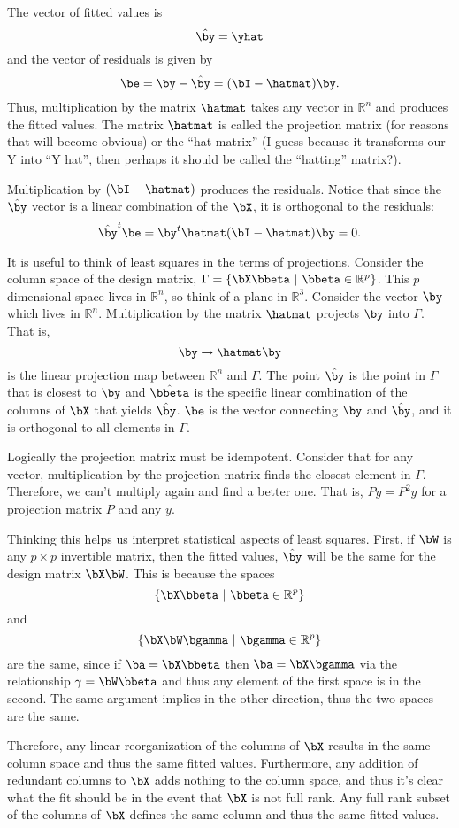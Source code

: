 The vector of fitted values is 
$$
\hat \by = \yhat 
$$
and the vector of residuals is given by
$$
\be = \by - \hat \by = (\bI - \hatmat) \by.
$$
Thus, multiplication by the matrix $\hatmat$ takes any vector in
$\mathbb{R}^n$ and produces the fitted values. The matrix $\hatmat$
is called the projection matrix (for reasons that will become obvious) 
or the ``hat matrix'' (I guess because it transforms our Y into ``Y hat'',
then perhaps it
should be called the ``hatting'' matrix?).


Multiplication
by $(\bI - \hatmat)$ produces the residuals. Notice that
since the $\hat \by$ vector is a linear combination of the $\bX$,
it is orthogonal to the residuals:
$$
\hat \by^t \be = \by ^ t \hatmat (\bI - \hatmat)\by = 0.
$$

It is useful to think of least squares in the terms of projections.
Consider the column space of the design matrix, 
$\Gamma = \{ \bX \bbeta ~|~ \bbeta \in \mathbb{R}^p\}$. This $p$ 
dimensional space lives in $\mathbb{R}^n$, so think of a plane in 
$\mathbb{R}^3$. Consider the vector $\by$ which lives in $\mathbb{R}^n$. Multiplication by the matrix $\hatmat$ projects $\by$ into $\Gamma$. That
is, 
$$
\by \rightarrow \hatmat\by
$$
is the linear projection map between $\mathbb{R}^n$ and $\Gamma$.
The point $\hat \by$ is the point in $\Gamma$ that is closest to $\by$ and
$\hat \bbeta$ is the specific linear combination of the columns
of $\bX$ that yields $\hat \by$. 
$\be$ is the vector connecting $\by$ and $\hat \by$, and it is
orthogonal to all elements in $\Gamma$.  

Logically the projection matrix must be idempotent. Consider that
for any vector, multiplication by the projection matrix finds the
closest element in $\Gamma$. Therefore, we can't multiply again
and find a better one. That is, $Py = P^2 y$ for a projection
matrix $P$ and any $y$.


Thinking this helps us interpret statistical aspects of least squares.
First, if $\bW$ is any $p\times p $ invertible matrix, then the
fitted values, $\hat \by$ will be the same for the design matrix
$\bX \bW$. This is because the spaces
$$
\{\bX \bbeta ~|~ \bbeta \in \mathbb{R}^p\}
$$
and
$$
\{\bX \bW \bgamma ~|~ \bgamma \in \mathbb{R}^p\}
$$
are the same, since if $\ba = \bX \bbeta$ then $\ba = \bX \bgamma$ via the relationship $\gamma = \bW \bbeta$  and thus any element of the first
space is in the second. The same argument implies in the other direction,
thus the two spaces are the same.

Therefore, any linear reorganization of the columns of $\bX$ results in the
same column space and thus the same fitted values. Furthermore, any
addition of redundant columns to $\bX$ adds nothing to the column space,
and thus it's clear what the fit should be in the event that $\bX$ is
not full rank. Any full rank subset of the columns of $\bX$ defines
the same column and thus the same fitted values. 

